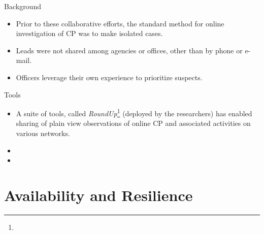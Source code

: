 \documentclass[notes]{beamer}
\begin{document}
\begin{frame}

\begin{block}{Background}

\begin{itemize}

\item[\checkmark]Prior to these collaborative efforts, the standard method for online investigation of CP was to make isolated cases.

\item[\checkmark]Leads were not shared among agencies or offices, other than by phone or e-mail.

\item[\checkmark]Officers leverage their own experience to prioritize suspects.

\end{itemize}

\end{block}

\end{frame}

\begin{frame}

\begin{block}{Tools}

\begin{itemize}

\item[\checkmark]A suite of tools, called \textit{RoundUp}\footnote{} (deployed by the researchers) has enabled sharing of plain view observations of online CP and associated activities on various networks.

\item[\checkmark]

\item[\checkmark]

\end{itemize}

\end{block}

\end{frame}

\section{Availability and Resilience}
\begin{frame}

\end{frame}
\end{document}

